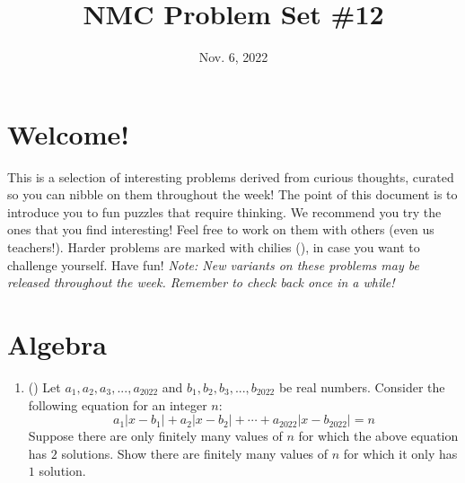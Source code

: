 \documentclass[11pt]{scrartcl}
\begin{document}
\title{NMC Problem Set \#12} %
\date{Nov. 6, 2022} %
\maketitle

\section*{Welcome!}

This is a selection of interesting problems derived from curious thoughts, curated so you can nibble on them throughout the week! The point of this document is to introduce you to fun puzzles that require thinking. We recommend you try the ones that you find interesting! Feel free to work on them with others (even us teachers!). Harder problems are marked with chilies (\fullchili), in case you want to challenge yourself.
\newline\newline
Have fun! \textit{Note: New variants on these problems may be released throughout the week. Remember to check back once in a while!}
    
\section{Algebra}
\begin{enumerate}[label=\textbf{A\arabic*}.]
    \item (\fullchili) Let $a_1,a_2,a_3,...,a_{2022}$ and $b_1,b_2,b_3,...,b_{2022}$ be real numbers. Consider the following equation for an integer $n$:
    \[ a_1|x-b_1| + a_2|x-b_2| + \cdots + a_{2022}|x-b_{2022}| = n \]
    Suppose there are only finitely many values of $n$ for which the above equation has $2$ solutions. Show there are finitely many values of $n$ for which it only has $1$ solution.
\end{enumerate}

\newpage
\end{document}
